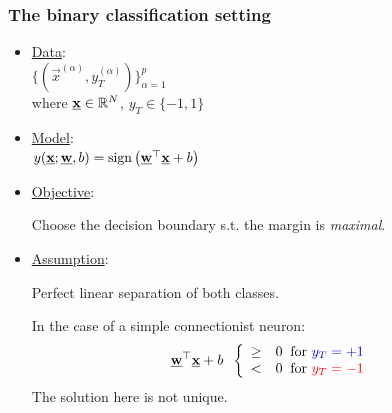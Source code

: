 \begin{frame}\frametitle{The binary classification setting}



\begin{itemize}
	\item \underline{Data}:\\
    
	$
	\Big\{ \left(\vec x^{(\alpha)}, y^{(\alpha)}_{T} \right) \Big\}_{\alpha=1}^{p}\,
	$\\
	where $\vec x \in \R^{N}$, $y_T \in \{-1, 1\}$\\

	\item \underline{Model}:\\
    
	$
	y(\vec x; \vec w,b) = \sign \big( \vec w^{\top} \vec x + b \big)
	$
    
    \item \underline{Objective}:
    
    Choose the decision boundary s.t. the margin is \emph{maximal}.
    
    \item \underline{Assumption}:
    
    Perfect linear separation of both classes.
    
    \pause
    
    In the case of a simple connectionist neuron:
    \begin{equation}
    \vec w^{\top} \vec x + b \;\;
    \left \{ \begin{array}{ll}
					\ge& 0 \;\;\text{for } {\color{blue}y_{T} = +1}\\
					<& 0 \;\;\text{for } {\color{red}y_{T} = -1}
				\end{array} \right.  
    \end{equation}
    The solution here is not unique.
    
\end{itemize}
    
\end{frame}

